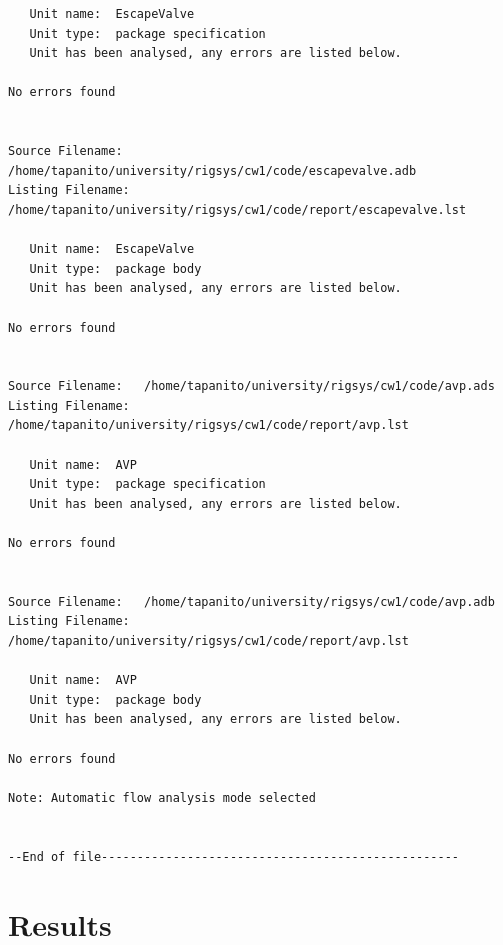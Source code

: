 \documentclass[a4paper, titlepage]{article}
\begin{document}
{\begin{lstlisting}
   Unit name:  EscapeValve
   Unit type:  package specification
   Unit has been analysed, any errors are listed below.

No errors found


Source Filename:   /home/tapanito/university/rigsys/cw1/code/escapevalve.adb
Listing Filename:  /home/tapanito/university/rigsys/cw1/code/report/escapevalve.lst

   Unit name:  EscapeValve
   Unit type:  package body
   Unit has been analysed, any errors are listed below.

No errors found


Source Filename:   /home/tapanito/university/rigsys/cw1/code/avp.ads
Listing Filename:  /home/tapanito/university/rigsys/cw1/code/report/avp.lst

   Unit name:  AVP
   Unit type:  package specification
   Unit has been analysed, any errors are listed below.

No errors found


Source Filename:   /home/tapanito/university/rigsys/cw1/code/avp.adb
Listing Filename:  /home/tapanito/university/rigsys/cw1/code/report/avp.lst

   Unit name:  AVP
   Unit type:  package body
   Unit has been analysed, any errors are listed below.

No errors found

Note: Automatic flow analysis mode selected


--End of file--------------------------------------------------

\end{lstlisting}
}
\section{Results}
\end{document}
